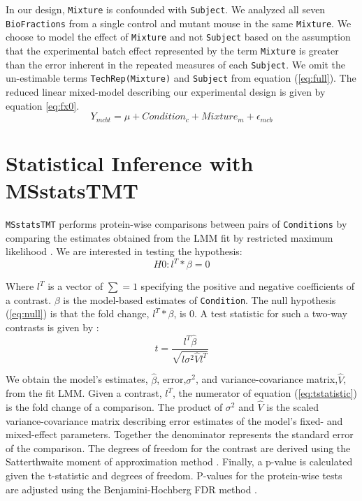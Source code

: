 \documentclass[11pt]{elife}\usepackage[]{graphicx}\usepackage[]{color}
\begin{document}
In our design, \texttt{Mixture} is confounded with \texttt{Subject}. We analyzed
all seven \texttt{BioFractions} from a single control and mutant mouse in the
same \texttt{Mixture}.  We choose to model the effect of \texttt{Mixture} and
not \texttt{Subject} based on the assumption that the experimental batch effect
represented by the term \texttt{Mixture} is greater than the error inherent in
the repeated measures of each \texttt{Subject}.  We omit the un-estimable terms
\texttt{TechRep(Mixture)} and \texttt{Subject} from equation (\ref{eq:full}).
The reduced linear mixed-model describing our experimental design is given by
equation \ref{eq:fx0}.
\begin{equation}
	\label{eq:fx0}
	Y_{mcbt} = \mu + Condition_c + Mixture_m + \epsilon_{mcb}
\end{equation}


\section{Statistical Inference with MSstatsTMT}

\texttt{MSstatsTMT} performs protein-wise comparisons between pairs of
\texttt{Conditions} by comparing the estimates obtained from the LMM fit by
restricted maximum likelihood \citep{Bates2015}. We are interested in testing
the hypothesis:
\begin{equation}
	\label{eq:null} %
	H0 : l^T * \beta = 0 
\end{equation}

Where $l^T$ is a vector of $\sum=1$ specifying the positive and negative
coefficients of a contrast. $\beta$ is the model-based estimates of
\texttt{Condition}.  The null hypothesis (\ref{eq:null}) is that the fold
change, $l^T * \beta$, is 0.  A test statistic for such a two-way contrasts is
given by \cite{Kuznetsova2017}:
\begin{equation} 
	\label{eq:tstatistic} %
	t = \frac{l^T \hat{\beta}}{\sqrt{l \sigma^2 \hat{V} l^T}}
\end{equation}

We obtain the model's estimates, $\hat{\beta}$, error,$\sigma^2$, and
variance-covariance matrix,$\hat{V}$, from the fit LMM.  Given a contrast, $l^T$,
the numerator of equation (\ref{eq:tstatistic}) is the fold change of a
comparison.  The product of $\sigma^2$ and $\hat{V}$ is the scaled
variance-covariance matrix describing error estimates of the model's fixed- and
mixed-effect parameters.  Together the denominator represents the standard error
of the comparison. The degrees of freedom for the contrast are derived using the
Satterthwaite moment of approximation method \citep{Kuznetsova2017}.  Finally, a
p-value is calculated given the t-statistic and degrees of freedom.  P-values
for the protein-wise tests are adjusted using the Benjamini-Hochberg FDR method
\citep{Huang2020}.
\end{document}
